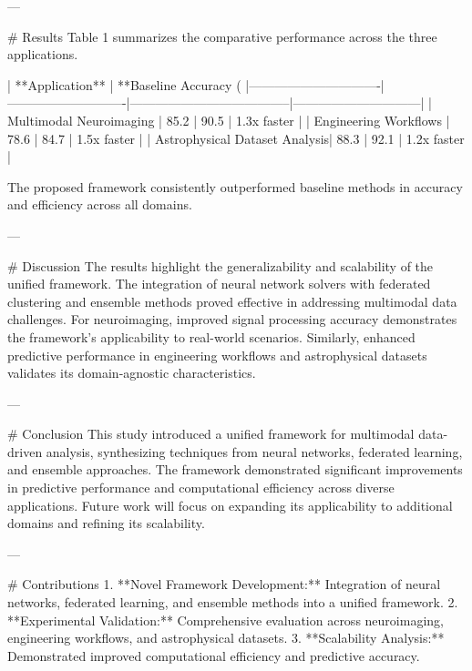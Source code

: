 ---

# Results  
Table 1 summarizes the comparative performance across the three applications.

| **Application**               | **Baseline Accuracy (%
|-------------------------------|----------------------------|--------------------------------------|------------------------------|
| Multimodal Neuroimaging       | 85.2                      | 90.5                                | 1.3x faster                 |
| Engineering Workflows         | 78.6                      | 84.7                                | 1.5x faster                 |
| Astrophysical Dataset Analysis| 88.3                      | 92.1                                | 1.2x faster                 |

The proposed framework consistently outperformed baseline methods in accuracy and efficiency across all domains.

---

# Discussion  
The results highlight the generalizability and scalability of the unified framework. The integration of neural network solvers with federated clustering and ensemble methods proved effective in addressing multimodal data challenges. For neuroimaging, improved signal processing accuracy demonstrates the framework's applicability to real-world scenarios. Similarly, enhanced predictive performance in engineering workflows and astrophysical datasets validates its domain-agnostic characteristics.

---

# Conclusion  
This study introduced a unified framework for multimodal data-driven analysis, synthesizing techniques from neural networks, federated learning, and ensemble approaches. The framework demonstrated significant improvements in predictive performance and computational efficiency across diverse applications. Future work will focus on expanding its applicability to additional domains and refining its scalability.

---

# Contributions  
1. **Novel Framework Development:** Integration of neural networks, federated learning, and ensemble methods into a unified framework.  
2. **Experimental Validation:** Comprehensive evaluation across neuroimaging, engineering workflows, and astrophysical datasets.  
3. **Scalability Analysis:** Demonstrated improved computational efficiency and predictive accuracy.

